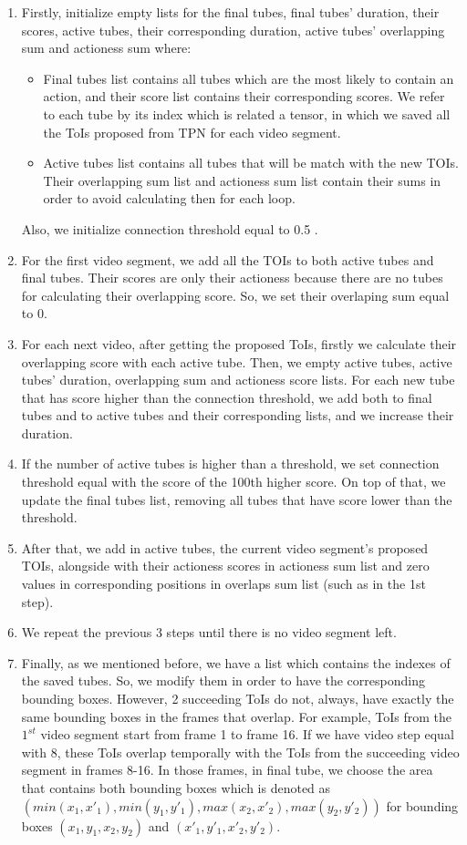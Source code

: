 \begin{enumerate}
\item Firstly,  initialize empty lists for the final tubes, final tubes' duration, their scores, active tubes, their corresponding duration,
  active tubes' overlapping sum and actioness sum where:
  \begin{itemize}
  \item Final tubes list contains all tubes which are the most likely to contain an action, and their score list contains their
    corresponding scores. We refer to each tube by its index which is related a tensor, in which we saved all the ToIs proposed
    from TPN for each video segment.
  \item Active tubes list contains all tubes that will be match with the new TOIs. Their overlapping sum list and actioness sum list
    contain their sums in order to avoid calculating then for each loop. 
  \end{itemize}
Also, we initialize  connection threshold equal to 0.5 .
\item For the first video segment, we add all the TOIs to both active tubes and final tubes. Their scores are only their actioness because
  there are no tubes for calculating their overlapping score. So, we set their overlaping sum equal to 0.
\item For each next video, after getting the proposed ToIs, firstly we calculate their overlapping score with each active tube. Then, we
  empty active tubes, active tubes' duration, overlapping sum and actioness score lists.  For each new tube that has score higher than the
  connection threshold,  we add both to final tubes and to active tubes and their corresponding lists, and we increase their duration.
\item If the number of active tubes is higher than a threshold, we set connection threshold equal with the score of
  the 100th higher score. On top of that, we update the final tubes list, removing all tubes that have score lower than the threshold.
\item After that, we add in active tubes, the current video segment's proposed TOIs, alongside with their actioness scores in actioness sum list and
  zero values in corresponding positions in overlaps sum list (such as in the 1st step).
\item We repeat the previous 3 steps until there is no video segment left.
\item Finally, as we mentioned before, we have a list which contains the indexes of the saved tubes. So, we modify them in order to have
  the corresponding bounding boxes. However, 2 succeeding ToIs do not, always, have exactly the same bounding boxes in the frames that overlap. For example,
  ToIs from the $1^{st}$ video segment start from frame 1 to frame 16. If we have video step equal with 8, these ToIs overlap temporally
  with the ToIs from the  succeeding video segment in frames 8-16. In those frames, in final tube, we choose the area that contains both bounding boxes which is
  denoted as $(min(x_1,x'_1), min(y_1,y'_1), max(x_2,x'_2), max(y_2,y'_2))$ for bounding boxes $(x_1,y_1,x_2,y_2)$ and $(x'_1,y'_1,x'_2,y'_2)$.
\end{enumerate}
